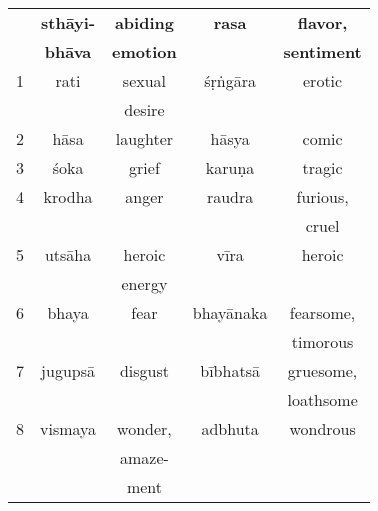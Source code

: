 \documentclass[10pt]{article}
\begin{document}
\begin{multicols}{2}

	\begin{tabular}{|c||c|c||c|c|}
		\hline
		  & \textbf{sthāyi-} & \textbf{abiding} & \textbf{rasa} & \textbf{flavor,}      \\
		  & \textbf{bhāva}   & \textbf{emotion} &               & \textbf{sentiment}    \\
		\hline
		1 & rati             & sexual           & śṛṅgāra       & erotic                \\
		  &                  & desire           &               &                       \\
		\hline
		2 & hāsa             & laughter         & hāsya         & comic                 \\
		\hline
		3 & śoka             & grief            & karuṇa        & tragic                \\
		\hline
		4 & krodha           & anger            & raudra        & furious,              \\
		  &                  &                  &               & cruel                 \\
		\hline
		5 & utsāha           & heroic           & vīra          & heroic                \\
		  &                  & energy           &               &                       \\
		\hline
		6 & bhaya            & fear             & bhayānaka     & fearsome,             \\
		  &                  &                  &               & timorous              \\
		\hline
		7 & jugupsā          & disgust          & bībhatsā      & gruesome,             \\
		  &                  &                  &               & loathsome             \\
		\hline
		8 & vismaya          & wonder,          & adbhuta       & wondrous              \\
		  &                  & amaze-           &               &                       \\
		  &                  & ment             &               &                       \\

\end{tabular}
\end{multicols}
\end{document}
